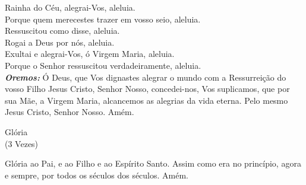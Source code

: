 \begin{flushleft}
    \VbarRed{} Rainha do Céu, alegrai-Vos, aleluia. \\
    \RbarRed{} Porque quem merecestes trazer em vosso seio, aleluia. \\
    \VbarRed{} Ressuscitou como disse, aleluia. \\
    \RbarRed{} Rogai a Deus por nós, aleluia.
    \vspace{.2cm} \\
    \VbarRed{} Exultai e alegrai-Vos, ó Virgem Maria, aleluia. \\
    \RbarRed{} Porque o Senhor ressuscitou verdadeiramente, aleluia.
    \vspace{.2cm} \\
    \textbf{\textit{Oremos:}} Ó Deus, que Vos dignastes alegrar o mundo com a Ressurreição do vosso Filho Jesus Cristo, Senhor Nosso, concedei-nos, Vos suplicamos, que por sua Mãe, a Virgem Maria, alcancemos as alegrias da vida eterna. Pelo mesmo Jesus Cristo, Senhor Nosso. Amém.
\end{flushleft}
\begin{center}
    Glória \\ \textcolor{VioletRed2}{\scriptsize{(3 Vezes)}}
\end{center}
\begin{flushleft}
    Glória ao Pai, e ao Filho e ao Espírito Santo. Assim como era no princípio, agora e sempre, por todos os séculos dos séculos. Amém.
\end{flushleft}
